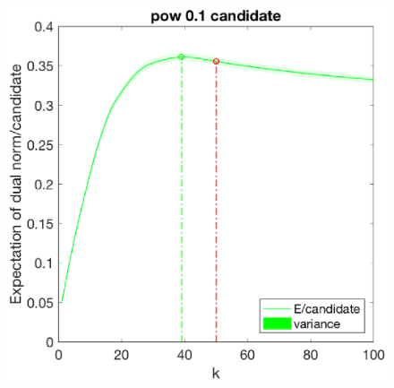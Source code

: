 \documentclass[12pt]{article}
\begin{document}
\begin{figure}[h]
\begin{minipage}[c]{.3\linewidth}
    \end{minipage}
    \hfill%
    \begin{minipage}[c]{.3\linewidth}
        \centering
        \includegraphics[width=\linewidth]{Fig/dualnorm-u0rand-k0-50-candidatepow.eps}
    \end{minipage}
\end{figure}
\end{document}
